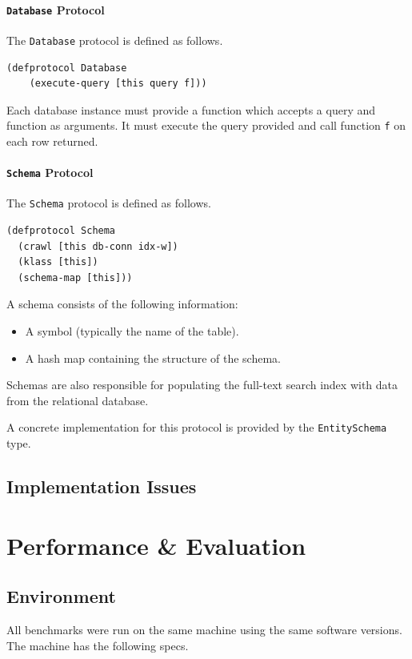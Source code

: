 \documentclass[12pt,letterpaper,oneside,notitlepage]{report}
\theoremstyle{definition}
\begin{document}
				\subsubsection{\texttt{Database} Protocol}
					The \texttt{Database} protocol is defined as follows.
					
					\begin{verbatim}
(defprotocol Database
	(execute-query [this query f]))
					\end{verbatim}
					
					Each database instance must provide a function which accepts a query and function as arguments.  It must execute the query provided and call function \texttt{f} on each row returned.
				
				\subsubsection{\texttt{Schema} Protocol}
					The \texttt{Schema} protocol is defined as follows.
					
					\begin{verbatim}
(defprotocol Schema
  (crawl [this db-conn idx-w])
  (klass [this])
  (schema-map [this]))
  				\end{verbatim}
					
					A schema consists of the following information:
					
					\begin{itemize}
						\item A symbol (typically the name of the table).
						\item A hash map containing the structure of the schema.
					\end{itemize}
					
					Schemas are also responsible for populating the full-text search index with data from the relational database.
					
					A concrete implementation for this protocol is provided by the \texttt{EntitySchema} type.
		
		\section{Implementation Issues}
	
	\chapter{Performance \& Evaluation}
		\section{Environment}
			All benchmarks were run on the same machine using the same software versions.  The machine has the following specs.
			
\end{document}
